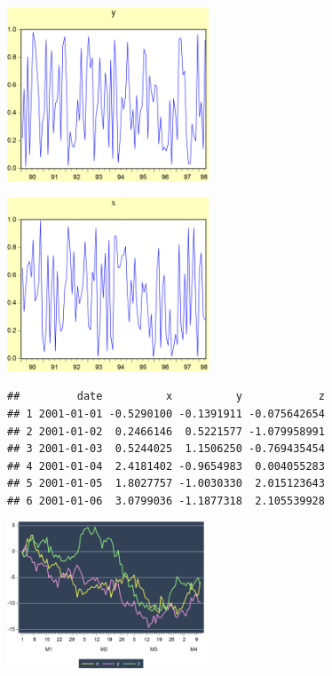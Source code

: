 \documentclass[
]{article}
\begin{document}
\begin{center}\includegraphics[width=0.45\textwidth]{test_engEviews_files/figure-latex//eview-graph-y} \end{center}

\begin{center}\includegraphics[width=0.45\textwidth]{test_engEviews_files/figure-latex//eview-graph-x} \end{center}

\begin{verbatim}
##         date          x          y            z
## 1 2001-01-01 -0.5290100 -0.1391911 -0.075642654
## 2 2001-01-02  0.2466146  0.5221577 -1.079958991
## 3 2001-01-03  0.5244025  1.1506250 -0.769435454
## 4 2001-01-04  2.4181402 -0.9654983  0.004055283
## 5 2001-01-05  1.8027757 -1.0030330  2.015123643
## 6 2001-01-06  3.0799036 -1.1877318  2.105539928
\end{verbatim}

\begin{center}\includegraphics[width=0.45\textwidth]{test_engEviews_files/figure-latex//rwalk-xyz} \end{center}
\end{document}
